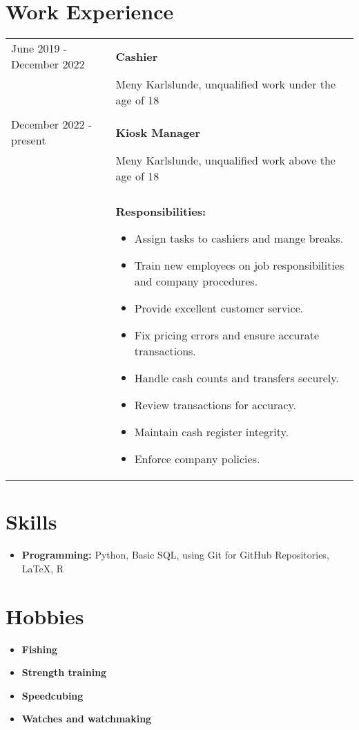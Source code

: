 \documentclass[12pt]{article}
\begin{document}
\section{Work Experience}
\begin{tabular}{ l p{6in} }
June 2019 - December 2022 & \textbf{Cashier} \\
                           & Meny Karlslunde, unqualified work under the age of 18 \\
   & \\                           
December 2022 - present & \textbf{Kiosk Manager} \\
                        & Meny Karlslunde, unqualified work above the age of 18 \\
		  & \\
                        & \textbf{Responsibilities:}
                        \begin{itemize}
  			    \item Assign tasks to cashiers and mange breaks.
			    \item Train new employees on job responsibilities \newline and company procedures.
                                    \item Provide excellent customer service.
                                    \item Fix pricing errors and ensure accurate transactions.
                                    \item Handle cash counts and transfers securely.
                                    \item Review transactions for accuracy.
                                    \item Maintain cash register integrity.
                                    \item Enforce company policies.
                        \end{itemize} \\
\end{tabular}

\newpage
\section{Skills}
\begin{itemize}
    \itemsep=-.3em
    \item \textbf{Programming:} Python, Basic SQL, using Git for GitHub Repositories, LaTeX, R
\end{itemize}

\section{Hobbies}
\begin{itemize}
   \itemsep=.3em
   \item \textbf{Fishing}
   \item \textbf{Strength training}
   \item \textbf{Speedcubing}	
   \item \textbf{Watches and watchmaking}
\end{itemize}
\end{document}
